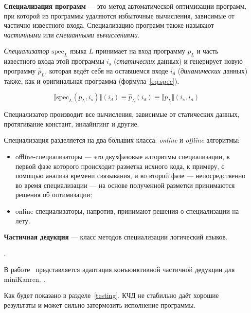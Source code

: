 {\bf Специализация программ} --- это метод автоматической оптимизации программ,
при которой из программы удаляются избыточные вычисления, зависимые от частично известного входа.
Специализацию программ также называют \emph{частичными} или \emph{смешанными вычислениями}\cite{jones}.

{\it Специализатор} $\text{spec}_L$ языка $L$ принимает на вход программу $p_L$ и часть известного входа этой
программы $i_s$ (\emph{статических} данных) и генерирует новую программу $\hat{p}_L$, которая ведёт себя на оставшемся
входе $i_d$ (\emph{динамических} данных) также, как и оригинальная программа (формула~\ref{eq:spec}).

\begin{equation}
  \llbracket \text{spec}_L(p_L, i_s) \rrbracket (i_d) \equiv \hat{p}_L (i_d) \equiv \llbracket p_L \rrbracket (i_s, i_d)
\label{eq:spec}
\end{equation}

Специализатор производит все вычисления, зависимые от статических данных,
протягивание констант, инлайнгинг и другие.


Специализация разделяется на два больших класса: \emph{online} и \emph{offline} алгоритмы:
\begin{itemize}
\item offline-cпециализаторы --- это двухфазовые алгоритмы специализации, в первой фазе
которого происходит разметка исхного кода, к примеру, с помощью анализа времени связывания,
и во второй фазе --- непосредственно во время специализации --- на основе полученной
разметки принимаются решения об оптимизации;

\item online-специализаторы, напротив, принимают решения о специализации на лету.
\end{itemize}





{\bf Частичная дедукция} --- класс методов специализации логический языков.

\cite{advanced}

.

В работе~\cite{lozov} представляется адаптация конъюнктивной частичной дедукции для miniKanren.
.

Как будет показано в разделе~\ref{testing}, КЧД не стабильно даёт хорошие результаты и
может сильно затормозить исполнение программы.
